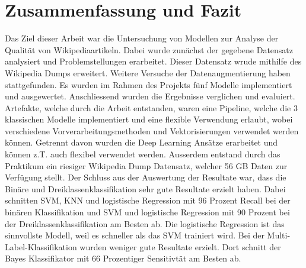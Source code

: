\section{Zusammenfassung und Fazit}
\label{ZusammenfassungUndFazit}
Das Ziel dieser Arbeit war die Untersuchung von Modellen zur Analyse der Qualität von Wikipediaartikeln. Dabei wurde zunächst der gegebene Datensatz analysiert und Problemstellungen erarbeitet. Dieser Datensatz wrude mithilfe des Wikipedia Dumps erweitert. Weitere Versuche der Datenaugmentierung haben stattgefunden. Es wurden im Rahmen des Projekts fünf Modelle implementiert und ausgewertet. Anschliessend wurden die Ergebnisse verglichen und evaluiert. Artefakte, welche durch die Arbeit entstanden, waren eine Pipeline, welche die 3 klassischen Modelle implementiert und eine flexible Verwendung erlaubt, wobei verschiedene Vorverarbeitungsmethoden und Vektorisierungen verwendet werden können. Getrennt davon wurden die Deep Learning Ansätze erarbeitet und können z.T. auch flexibel verwendet werden. Ausserdem entstand durch das Praktikum ein riesiger Wikipedia Dump Datensatz, welcher 56 GB Daten zur Verfügung stellt.
Der Schluss aus der Auswertung der Resultate war, dass die Binäre und Dreiklassenklassifikation sehr gute Resultate erzielt haben. Dabei schnitten SVM, KNN und logistische Regression mit 96 Prozent Recall bei der binären Klassifikation und SVM und logistische Regression mit 90 Prozent bei der Dreiklassenklassifikation am Besten ab. Die logistische Regression ist das sinnvollste Modell, weil es schneller als das SVM trainiert wird. Bei der Multi-Label-Klassifikation wurden weniger gute Resultate erzielt. Dort schnitt der Bayes Klassifikator mit 66 Prozentiger Sensitivtät am Besten ab.